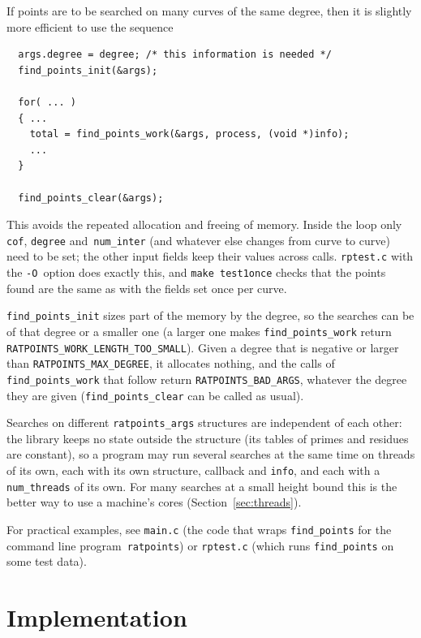 \documentclass[12pt,a4paper,oneside]{amsart}
\begin{document}
If points are to be searched on many curves of the same degree,
then it is slightly more efficient to use the sequence

\begin{verbatim}
  args.degree = degree; /* this information is needed */
  find_points_init(&args);

  for( ... )
  { ...
    total = find_points_work(&args, process, (void *)info);
    ...
  }

  find_points_clear(&args);
\end{verbatim}

This avoids the repeated allocation and freeing of memory. Inside the loop
only \texttt{cof}, \texttt{degree} and~\texttt{num\_inter} (and whatever
else changes from curve to curve) need to be set; the other input fields
keep their values across calls. \texttt{rptest.c} with
the \verb+-O+~option does exactly this, and \texttt{make test1once} checks
that the points found are the same as with the fields set once per curve.

\texttt{find\_points\_init} sizes part of the memory by the degree, so the
searches can be of that degree or a smaller one (a larger one makes
\texttt{find\_points\_work} return
\texttt{RATPOINTS\_WORK\_LENGTH\_TOO\_SMALL}). Given a degree that is
negative or larger than \texttt{RATPOINTS\_MAX\_DEGREE}, it allocates
nothing, and the calls of \texttt{find\_points\_work} that follow return
\texttt{RATPOINTS\_BAD\_ARGS}, whatever the degree they are given
(\texttt{find\_points\_clear} can be called as usual).

Searches on different \texttt{ratpoints\_args} structures are independent
of each other: the library keeps no state outside the structure (its
tables of primes and residues are constant), so a program may run several
searches at the same time on threads of its own, each with its own
structure, callback and \texttt{info}, and each with a
\texttt{num\_threads} of its own. For many searches at a small height
bound this is the better way to use a machine's cores
(Section~\ref{sec:threads}).

For practical examples, see \texttt{main.c} (the code that wraps
\texttt{find\_points} for the command line program~\texttt{ratpoints}) or
\texttt{rptest.c} (which runs \texttt{find\_points} on some test data).


\section{Implementation} \label{impl}
\end{document}
